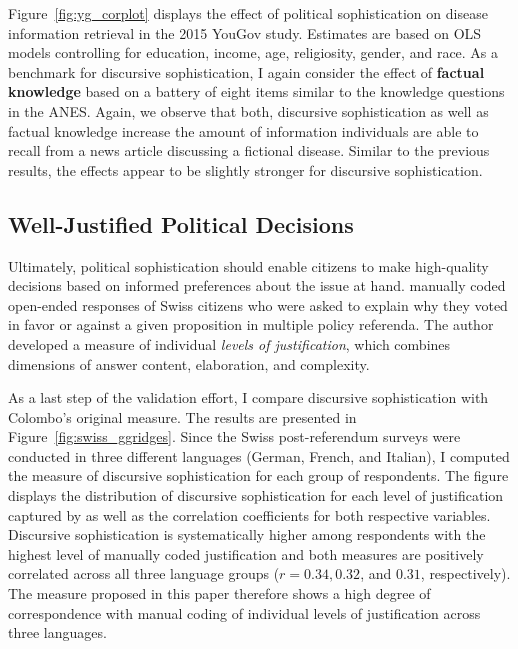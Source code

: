 \documentclass[12pt]{article}
\begin{document}
Figure~\ref{fig:yg_corplot} displays the effect of political sophistication on disease information retrieval in the 2015 YouGov study. Estimates are based on OLS models controlling for education, income, age, religiosity, gender, and race. As a benchmark for discursive sophistication, I again consider the effect of \textbf{factual knowledge} based on a battery of eight items similar to the knowledge questions in the ANES. Again, we observe that both, discursive sophistication as well as factual knowledge increase the amount of information individuals are able to recall from a news article discussing a fictional disease. Similar to the previous results, the effects appear to be slightly stronger for discursive sophistication.


\subsection*{Well-Justified Political Decisions}

Ultimately, political sophistication should enable citizens to make high-quality decisions based on informed preferences about the issue at hand. \citet{colombo2016justifications} manually coded open-ended responses of Swiss citizens who were asked to explain why they voted in favor or against a given proposition in multiple policy referenda. The author developed a measure of individual \textit{levels of justification}, which combines dimensions of answer content, elaboration, and complexity.

As a last step of the validation effort, I compare discursive sophistication with Colombo's \citeyearpar{colombo2016justifications} original measure. The results are presented in Figure~\ref{fig:swiss_ggridges}. Since the Swiss post-referendum surveys were conducted in three different languages (German, French, and Italian), I computed the measure of discursive sophistication for each group of respondents. The figure displays the distribution of discursive sophistication for each level of justification captured by \citet{colombo2016justifications} as well as the correlation coefficients for both respective variables. Discursive sophistication is systematically higher among respondents with the highest level of manually coded justification and both measures are positively correlated across all three language groups ($r=0.34, 0.32$, and $0.31$, respectively). The measure proposed in this paper therefore shows a high degree of correspondence with manual coding of individual levels of justification across three languages.
\end{document}
